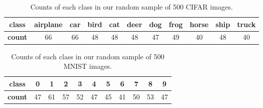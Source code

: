 \begin{table}
    \caption{Counts of each class in our random sample of 500 CIFAR images.}
    
    \smallskip 
    \label{tab:cifar-counts}
    \centering
    \begin{tabular}{c|*{10}{c}}
    \toprule
        \textbf{class} & airplane & car & bird & cat & deer & dog & frog & horse & ship & truck \\
         \midrule
        \textbf{count} &  66 & 66 & 48 & 48 & 48 & 47 & 49 & 40 & 48 & 40 \\
        \bottomrule
    \end{tabular}
    \end{table}

\begin{table}
    \caption{Counts of each class in our random sample of 500 MNIST images.}
    
    \smallskip 
    \label{tab:mnist-counts}
    \centering
    \begin{tabular}{c|*{10}{c}}
    \toprule
           \textbf{class} & 0 & 1 & 2 & 3 & 4 & 5 & 6 & 7 & 8 & 9 \\
         \midrule
        \textbf{count} &  47 & 61 & 57 & 52 & 47 & 45 & 41 & 50 & 53 & 47 \\
        \bottomrule
    \end{tabular}
    \end{table}
